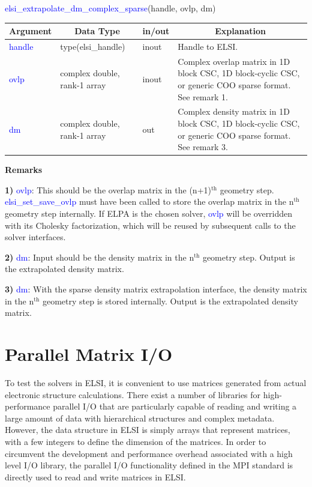 \documentclass{report}
\begin{document}
\begin{labeling}{\hspace{6cm}}
\item [\hspace{0.3cm} \textcolor{blue}{elsi\_extrapolate\_dm\_complex\_sparse}(handle, ovlp, dm)]
\end{labeling}

\begin{tabular}[]{|p{20mm}|p{45mm}|p{15mm}|p{85mm}|}
\hline
\multicolumn{1}{|c|}{\textbf{Argument}} & \multicolumn{1}{c|}{\textbf{Data Type}} & \multicolumn{1}{c|}{\textbf{in/out}} & \multicolumn{1}{c|}{\textbf{Explanation}}\\
\hline
\textcolor{blue}{handle} & type(elsi\_handle)           & inout & Handle to ELSI.\\
\hline
\textcolor{blue}{ovlp}   & complex double, rank-1 array & inout & Complex overlap matrix in 1D block CSC, 1D block-cyclic CSC, or generic COO sparse format.  See remark 1.\\
\hline
\textcolor{blue}{dm}     & complex double, rank-1 array & out   & Complex density matrix in 1D block CSC, 1D block-cyclic CSC, or generic COO sparse format.  See remark 3.\\
\hline
\end{tabular}

\textbf{Remarks}

\textbf{1)} \textcolor{blue}{ovlp}:  This should be the overlap matrix in the (n+1)$^\text{th}$ geometry step.  \textcolor{blue}{elsi\_set\_save\_ovlp} must have been called to store the overlap matrix in the n$^\text{th}$ geometry step internally.  If ELPA is the chosen solver, \textcolor{blue}{ovlp} will be overridden with its Cholesky factorization, which will be reused by subsequent calls to the solver interfaces.

\textbf{2)} \textcolor{blue}{dm}:  Input should be the density matrix in the n$^\text{th}$ geometry step.  Output is the extrapolated density matrix.

\textbf{3)} \textcolor{blue}{dm}:  With the sparse density matrix extrapolation interface, the density matrix in the n$^\text{th}$ geometry step is stored internally.  Output is the extrapolated density matrix.

\section{Parallel Matrix I/O}
\label{sec:rw}
To test the solvers in ELSI, it is convenient to use matrices generated from actual electronic structure calculations.  There exist a number of libraries for high-performance parallel I/O that are particularly capable of reading and writing a large amount of data with hierarchical structures and complex metadata.  However, the data structure in ELSI is simply arrays that represent matrices, with a few integers to define the dimension of the matrices.  In order to circumvent the development and performance overhead associated with a high level I/O library, the parallel I/O functionality defined in the MPI standard is directly used to read and write matrices in ELSI.
\end{document}
